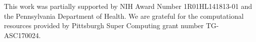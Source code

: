 This work was partially supported by NIH Award Number 1R01HL141813-01 and the Pennsylvania Department of Health. We are grateful for the computational resources provided by Pittsburgh Super Computing grant number TG-ASC170024.

